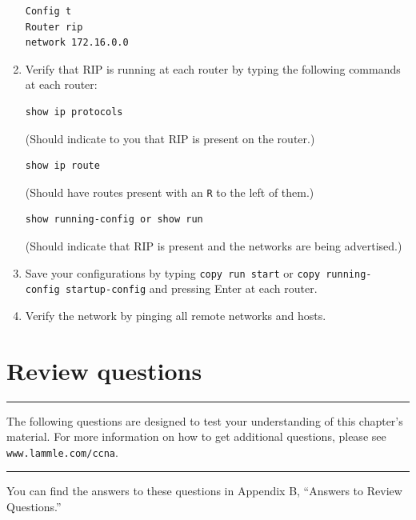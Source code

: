 \begin{enumerate}
\begin{verbatim}
Config t
Router rip
network 172.16.0.0
\end{verbatim}
\item
  \protect\hypertarget{c09.xhtmlux5cux23Page_404}{}{}Verify that RIP is
  running at each router by typing the following commands at each
  router:

\begin{verbatim}
show ip protocols
\end{verbatim}

  (Should indicate to you that RIP is present on the router.)

\begin{verbatim}
show ip route
\end{verbatim}

  (Should have routes present with an \texttt{R} to the left of them.)

\begin{verbatim}
show running-config or show run
\end{verbatim}

  (Should indicate that RIP is present and the networks are being
  advertised.)
\item
  Save your configurations by typing \texttt{copy\ run\ start} or
  \texttt{copy\ running-config\ startup-config} and pressing Enter at
  each router.
\item
  Verify the network by pinging all remote networks and hosts.
\end{enumerate}




\section{Review questions}

\begin{center}\rule{0.5\linewidth}{0.5pt}\end{center}

The following questions are designed
to test your understanding of this chapter's material. For more
information on how to get additional questions, please see
\texttt{www.lammle.com/ccna}.

\begin{center}\rule{0.5\linewidth}{0.5pt}\end{center}

You can find the answers to these questions in Appendix B, ``Answers to
Review Questions.''

